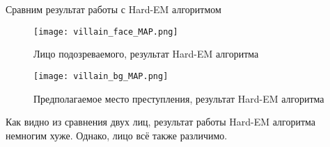 Сравним результат работы с Hard-EM алгоритмом

\begin{figure}[H]
	\label{villain_face_MAP}
	\texttt{[image: villain\_face\_MAP.png]}
	\centering
	\caption{Лицо подозреваемого, результат Hard-EM алгоритма}
\end{figure}

\begin{figure}[H]
	\label{villain_bg_MAP}
	\texttt{[image: villain\_bg\_MAP.png]}
	\centering
	\caption{Предполагаемое место преступления, результат Hard-EM алгоритма}
\end{figure}

Как видно из сравнения двух лиц, результат работы Hard-EM алгоритма немногим хуже. Однако, лицо всё также различимо.